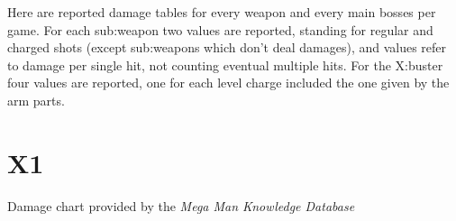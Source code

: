 Here are reported damage tables for every weapon and every main bosses per game. For each sub:weapon two values are reported, standing for regular and charged shots (except sub:weapons which don't deal damages), and values refer to damage per single hit, not counting eventual multiple hits. For the X:buster four values are reported, one for each level charge included the one given by the arm parts.
\section{X1}
Damage chart provided by the \emph{Mega Man Knowledge Database}~\cite{wiki:damage_chart_X1}

\begin{table}[htp]
\end{table}
